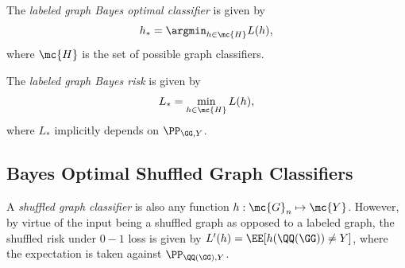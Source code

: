 \documentclass[10pt,journal,cspaper,compsoc]{IEEEtran}
\begin{document}
	The \emph{labeled graph Bayes optimal classifier} is given by
	\begin{align}
		h_* = \argmin_{h \in \mc{H}} L(h),
	\end{align}
	where $\mc{H}$ is the set of possible graph classifiers.
	
	The \emph{labeled graph Bayes risk} is given by 
	\begin{align}
		L_* =\min_{h \in \mc{H}} L(h),
	\end{align}
	where $L_*$ implicitly depends on $\PP_{\GG,Y}$.




\subsection{Bayes Optimal Shuffled Graph Classifiers} %

A \emph{shuffled graph classifier} is also any function $h: \mc{G}_n \mapsto \mc{Y}$. However, by virtue of the input being a shuffled graph as opposed to a labeled graph, the shuffled risk under $0-1$ loss is given by $L'(h)=\EE[h(\QQ(\GG)) \neq Y]$, where the expectation is taken against $\PP_{\QQ(\GG),Y}$. %
\end{document}
